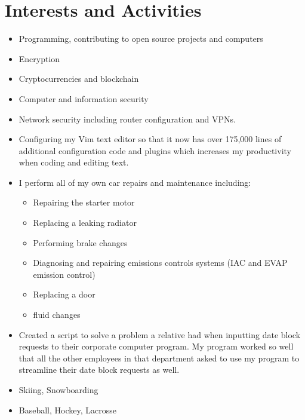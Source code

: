 \documentclass[]{friggeri-cv} %
\begin{document}



\section{Interests and Activities}

\begin{entrylist}
\interest
{
\begin{itemize}
\item Programming, contributing to open source projects and computers
\item Encryption
\item Cryptocurrencies and blockchain
\item Computer and information security
\item Network security including router configuration and VPNs.
\item Configuring my Vim text editor so that it now has over 175,000 lines of
additional configuration code and plugins which increases my productivity when
coding and editing text.
\item I perform all of my own car repairs and maintenance including:
  \begin{itemize}
    \item Repairing the starter motor
    \item Replacing a leaking radiator
    \item Performing brake changes
    \item Diagnosing and repairing emissions controls systems (IAC and EVAP
    emission control)
    \item Replacing a door
    \item fluid changes
  \end{itemize}
\item Created a script to solve a problem a relative had when inputting date
block requests to their corporate computer program. My program worked so well
that all the other employees in that department asked to use my program to
streamline their date block requests as well.
\item Skiing, Snowboarding
\item Baseball, Hockey, Lacrosse
\end{itemize}
}
\end{entrylist}
\end{document}
